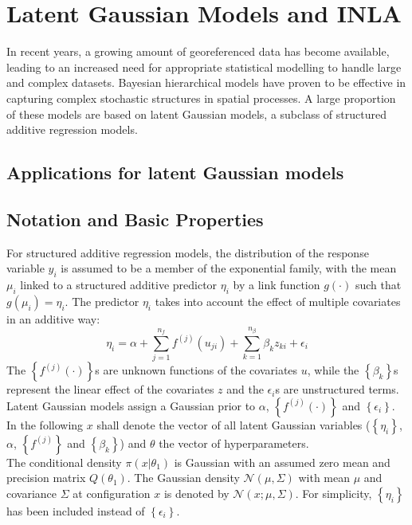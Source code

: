 \documentclass[12pt]{book}
\begin{document}
\section{Latent Gaussian Models and INLA}
In recent years, a growing amount of georeferenced data has become available, leading to an increased need for appropriate statistical modelling to handle large and complex datasets. Bayesian hierarchical models have proven to be effective in capturing complex stochastic structures in spatial processes. A large proportion of these models are based on latent Gaussian models, a subclass of structured additive regression models. 
\subsection{Applications for latent Gaussian models}
\subsection{Notation and Basic Properties}
\label{sec:notation}
For structured additive regression models, the distribution of the response variable $y_i$ is assumed to be a member of the exponential family, with the mean $\mu_i$ linked to a structured additive predictor $\eta_i$ by a link function $g\left(\cdot\right)$ such that $g\left(\mu_i\right)=\eta_i$. The predictor $\eta_i$  takes into account the effect of multiple covariates in an additive way:
\begin{equation}\label{eq:predictor}
    \eta_i=\alpha+\sum_{j=1}^{n_f}f^{(j)}\left(u_{ji}\right)+\sum_{k=1}^{n_{\beta}}\beta_kz_{ki}+\epsilon_i
\end{equation}
The $\left\lbrace f^{(j)}\left(\cdot\right)\right\rbrace$s are unknown functions of the covariates $u$, while the $\left\lbrace\beta_k\right\rbrace$s represent the linear effect of the covariates $z$ and the $\epsilon_i$s are unstructured terms. Latent Gaussian models assign a Gaussian prior to $\alpha$, $\left\lbrace f^{(j)}\left(\cdot\right)\right\rbrace$ and $\left\lbrace\epsilon_i\right\rbrace$. In the following $x$ shall denote the vector of all latent Gaussian variables ($\left\lbrace\eta_i\right\rbrace$, $\alpha$, $\left\lbrace f^{(j)}\right\rbrace$ and $\left\lbrace\beta_k\right\rbrace$) and $\theta$ the vector of hyperparameters. \\
The conditional density $\pi\left(x|\theta_1\right)$ is Gaussian with an assumed zero mean and precision matrix $Q\left(\theta_1\right)$. The Gaussian density $\mathcal{N}\left(\mu,\Sigma\right)$ with mean $\mu$ and covariance $\Sigma$ at configuration $x$ is denoted by $\mathcal{N}\left(x;\mu,\Sigma\right)$. For simplicity, $\left\lbrace\eta_i\right\rbrace$ has been included instead of $\left\lbrace\epsilon_i\right\rbrace$. \\
\end{document}
